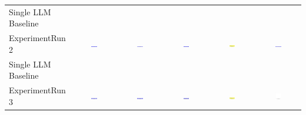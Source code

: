 \begin{table}
\begin{tabular}{@{}lccccc@{}}
    Single LLM Baseline \\
    ExperimentRun 2 & \includegraphics[width=0.15\textwidth]{./run_2/png/gpt-4o_results/ViaConnection.png} & \includegraphics[width=0.15\textwidth]{./run_2/png/o1-preview_results/ViaConnection.png} & \includegraphics[width=0.15\textwidth]{./run_2/png/claude-3-5-sonnet-20240620_results/ViaConnection.png} & \includegraphics[width=0.15\textwidth]{./run_2/png/watsonx_meta-llama_llama-3-1-70b-instruct_results/ViaConnection.png} & \includegraphics[width=0.15\textwidth]{./run_2/png/watsonx_meta-llama_llama-3-405b-instruct_results/ViaConnection.png} \\
    Single LLM Baseline \\
    ExperimentRun 3 & \includegraphics[width=0.15\textwidth]{./run_3/png/gpt-4o_results/ViaConnection.png} & \includegraphics[width=0.15\textwidth]{./run_3/png/o1-preview_results/ViaConnection.png} & \includegraphics[width=0.15\textwidth]{./run_3/png/claude-3-5-sonnet-20240620_results/ViaConnection.png} & \includegraphics[width=0.15\textwidth]{./run_3/png/watsonx_meta-llama_llama-3-1-70b-instruct_results/ViaConnection.png} & \includegraphics[width=0.15\textwidth]{./run_3/png/watsonx_meta-llama_llama-3-405b-instruct_results/ViaConnection.png} \\

\end{tabular}
\end{table}
